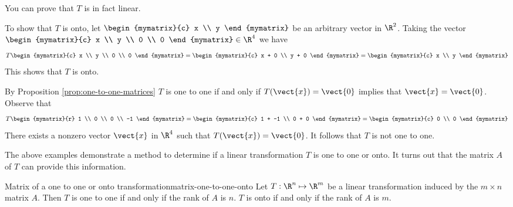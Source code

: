 \begin{solution} 
You can prove that $T$ is in fact linear. 

To show that $T$ is onto, let $\begin{mymatrix}{c} 
x \\
y
\end{mymatrix}$ be an arbitrary vector in $\R^2$. Taking the vector $\begin{mymatrix}{c}
x \\
y \\
0 \\
0 
\end{mymatrix} \in \R^4$ we have 
\[
T \begin{mymatrix}{c}
x \\
y \\
0 \\
0
\end{mymatrix} = 
\begin{mymatrix}{c}
x + 0 \\
y + 0 
\end{mymatrix}
= \begin{mymatrix}{c}
x \\
y 
\end{mymatrix}
\]
This shows that $T$ is onto. 

By Proposition \ref{prop:one-to-one-matrices} $T$ is one to one if and only if $T(\vect{x}) = \vect{0}$ implies that $\vect{x} = \vect{0}$. Observe that 
\[
T \begin{mymatrix}{r}
1 \\
0 \\
0 \\
-1
\end{mymatrix} = 
\begin{mymatrix}{c}
1 + -1 \\
0 + 0 
\end{mymatrix}
= \begin{mymatrix}{c}
0 \\
0 
\end{mymatrix}
\]
There exists a nonzero vector $\vect{x}$ in $\R^4$ such that $T(\vect{x}) = \vect{0}$. It follows that $T$ is not one to one.
\end{solution}

The above examples demonstrate a method to determine if a linear transformation $T$ is one to one or onto. It turns out that the matrix $A$ of $T$ can provide this information.

\begin{theorem}{Matrix of a one to one or onto transformation}{matrix-one-to-one-onto}
Let $T: \R^n \mapsto \R^m$ be a linear transformation induced by the $m \times n$ matrix $A$. Then $T$ is one to one if and only if the rank of $A$ is $n$. $T$ is onto if and only if the rank of $A$ is $m$. 
\end{theorem}

